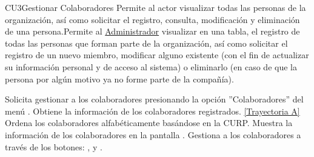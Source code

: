 	\begin{UseCase}{CU3}{Gestionar Colaboradores}{
		Permite al actor visualizar todas las personas de la organización, así como solicitar el registro, consulta, modificación y eliminación de una persona.Permite al {\hyperlink{admin}{Administrador} visualizar en una tabla, el registro de todas las personas que forman parte de la organización, así como solicitar el registro de un nuevo miembro, modificar alguno existente (con el fin de actualizar su información personal y de acceso al sistema) o eliminarlo (en caso de que la persona por algún motivo ya no forme parte de la compañía).\\}
	}
\end{UseCase}
\begin{UCtrayectoria}
	\UCpaso[\UCactor] Solicita gestionar a los colaboradores presionando la opción ''Colaboradores'' del menú .
	\UCpaso[\UCsist] Obtiene la información de los colaboradores registrados. \hyperlink{CU3:TAA}{[Trayectoria A]}
	\UCpaso[\UCsist] Ordena los colaboradores alfabéticamente basándose en la CURP.
	\UCpaso[\UCsist] Muestra la información de los colaboradores en la pantalla . \label{CU3-P3}
	\UCpaso[\UCactor] Gestiona a los colaboradores a través de los botones: , \editar  y \eliminar.
\end{UCtrayectoria}		
